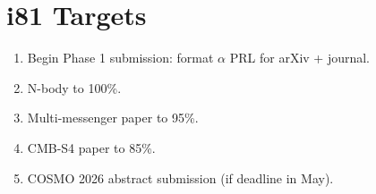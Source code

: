 \documentclass[11pt,a4paper]{article}
\begin{document}
\section{i81 Targets}

\begin{enumerate}[nosep]
\item Begin Phase 1 submission: format $\alpha$ PRL for arXiv + journal.
\item N-body to 100\%.
\item Multi-messenger paper to 95\%.
\item CMB-S4 paper to 85\%.
\item COSMO 2026 abstract submission (if deadline in May).
\end{enumerate}
\end{document}
